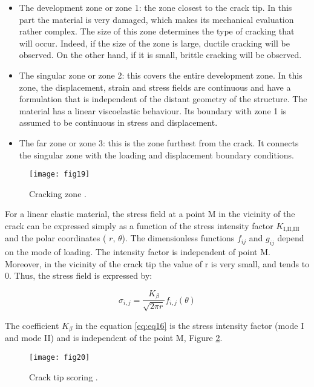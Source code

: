 \begin{itemize}
	\item The development zone or zone 1: the zone closest to the crack tip. In this part the material is very damaged, which makes its mechanical evaluation rather complex. The size of this zone determines the type of cracking that will occur. Indeed, if the size of the zone is large, ductile cracking will be observed. On the other hand, if it is small, brittle cracking will be observed.
	\item The singular zone or zone 2: this covers the entire development zone. In this zone, the displacement, strain and stress fields are continuous and have a formulation that is independent of the distant geometry of the structure. The material has a linear viscoelastic behaviour. Its boundary with zone 1 is assumed to be continuous in stress and displacement.
	\item The far zone or zone 3: this is the zone furthest from the crack. It connects the singular zone with the loading and displacement boundary conditions.
\end{itemize}


\begin{figure}[htp]
	\centering
	\texttt{[image: fig19]}
	\caption{Cracking zone \citep{MoutouPitti2008phd}.}
	\label{fig:fig19}
\end{figure}

For a linear elastic material, the stress field at a point M in the vicinity of the crack can be expressed simply as a function of the stress intensity factor $K_\textrm{I,II,III}$ and the polar coordinates ( $r$, $\theta$). The dimensionless functions $f_{ij}$  and  $g_{ij}$ depend on the mode of loading. The intensity factor is independent of point M. Moreover, in the vicinity of the crack tip the value of r is very small, and tends to 0. Thus, the stress field is expressed by:

\begin{equation}
	\sigma_{i,j} = \frac{K_{\beta}}{\sqrt{2 \pi r}} f_{i,j}(\theta)
	\label{eq:eq16}
\end{equation}

The coefficient $K_\beta$ in the equation \ref{eq:eq16} is the stress intensity factor (mode I and mode II) and is independent of the point M, Figure \ref{fig:fig20}.


\begin{figure}[htp]
	\centering
	\texttt{[image: fig20]}
	\caption{Crack tip scoring \citep{MoutouPitti2008phd}.}
	\label{fig:fig20}
\end{figure}

